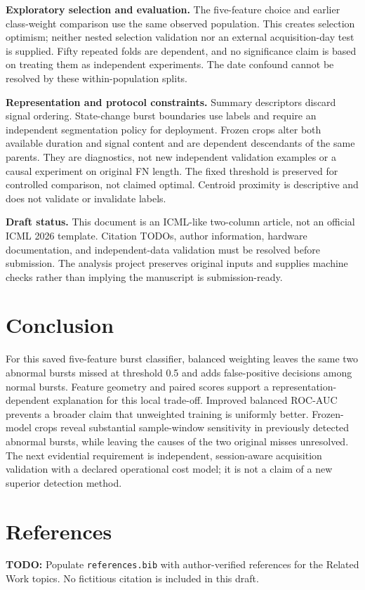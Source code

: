 \documentclass[10pt,twocolumn,letterpaper]{article}
\begin{document}
\textbf{Exploratory selection and evaluation.} The five-feature choice and earlier class-weight comparison use the same observed population. This creates selection optimism; neither nested selection validation nor an external acquisition-day test is supplied. Fifty repeated folds are dependent, and no significance claim is based on treating them as independent experiments. The date confound cannot be resolved by these within-population splits.

\textbf{Representation and protocol constraints.} Summary descriptors discard signal ordering. State-change burst boundaries use labels and require an independent segmentation policy for deployment. Frozen crops alter both available duration and signal content and are dependent descendants of the same parents. They are diagnostics, not new independent validation examples or a causal experiment on original FN length. The fixed threshold is preserved for controlled comparison, not claimed optimal. Centroid proximity is descriptive and does not validate or invalidate labels.

\textbf{Draft status.} This document is an ICML-like two-column article, not an official ICML 2026 template. Citation TODOs, author information, hardware documentation, and independent-data validation must be resolved before submission. The analysis project preserves original inputs and supplies machine checks rather than implying the manuscript is submission-ready.

\section{Conclusion}
For this saved five-feature burst classifier, balanced weighting leaves the same two abnormal bursts missed at threshold 0.5 and adds false-positive decisions among normal bursts. Feature geometry and paired scores support a representation-dependent explanation for this local trade-off. Improved balanced ROC-AUC prevents a broader claim that unweighted training is uniformly better. Frozen-model crops reveal substantial sample-window sensitivity in previously detected abnormal bursts, while leaving the causes of the two original misses unresolved. The next evidential requirement is independent, session-aware acquisition validation with a declared operational cost model; it is not a claim of a new superior detection method.

\section*{References}
\textbf{TODO:} Populate \texttt{references.bib} with author-verified references for the Related Work topics. No fictitious citation is included in this draft.
\end{document}
